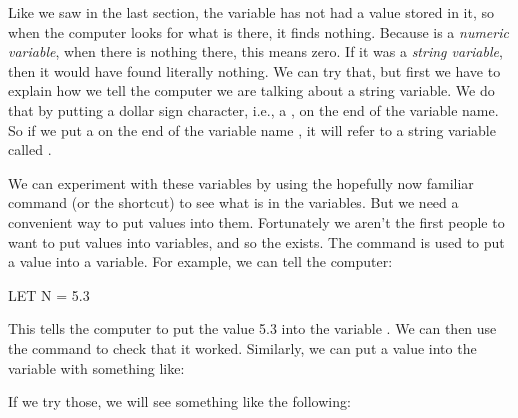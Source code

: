 
Like we saw in the last section, the variable  has not had a value stored in it, so when the computer looks for
what is there, it finds nothing.  Because  is a {\em numeric variable}, when there is
nothing there, this means zero.  If it was a {\em string variable}, then it would have found literally nothing.
We can try that, but first we have to explain how we tell the computer we are talking about a string variable.  We do that by
putting a dollar sign character, i.e., a \screentextwide{\$}, on the end of the variable name. So if we put a \screentextwide{\$} on
the end of the variable name , it will refer to a string variable called .

\needspace{4cm} %
We can experiment with these variables by using the hopefully now familiar
 command (or the  shortcut)
to see what is in the variables. But we need a convenient way to put
values into them.  Fortunately we aren't the first people to want to
put values into variables, and so the
 exists.
The  command is used to put a value into a
variable.  For example, we can tell the computer:

\begin{screenoutput}
  LET N = 5.3
\end{screenoutput}

\needspace{4cm} %
This tells the computer to put the value 5.3 into the variable
.  We can then use the 
command to check that it worked.  Similarly, we can put a value into
the variable  with something like:


\needspace{4cm} %
If we try those, we will see something like the following:


